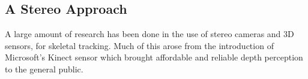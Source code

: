 \subsection{A Stereo Approach}

A large amount of research has been done in the use of stereo cameras and 3D sensors, for skeletal tracking. Much of this arose from the introduction of Microsoft's Kinect\cite{kinect} sensor which brought affordable and reliable depth perception to the general public.





